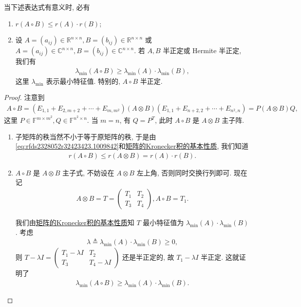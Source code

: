 \documentclass[../../main.tex]{subfiles}%
\begin{document}
\begin{theorem}[矩阵的Hadamard积的性质]
当下述表达式有意义时, 必有
\begin{enumerate}
\item $r(A\circ B)\leqslant r(A)\cdot r(B)$;

\item 设 $A=(a_{ij})\in\mathbb{R}^{n\times n}, B=(b_{ij})\in\mathbb{R}^{n\times n}$ 或 $A=(a_{ij})\in\mathbb{C}^{n\times n}, B=(b_{ij})\in\mathbb{C}^{n\times n}$. 若 $A,B$ 半正定或 Hermite 半正定, 我们有
\begin{align*}
\lambda_{\min}(A\circ B)\geqslant \lambda_{\min}(A)\cdot\lambda_{\min}(B),
\end{align*}
这里 $\lambda_{\min}$ 表示最小特征值. 特别的, $A\circ B$ 半正定.
\end{enumerate}
\end{theorem}
\begin{proof}

注意到
\begin{align}\label{eq:rfds2328052r32423423.1009842}
A\circ B=(E_{1,1}+E_{2,m+2}+\cdots+E_{m,m^2})(A\otimes B)(E_{1,1}+E_{n+2,2}+\cdots+E_{n^2,n})=P(A\otimes B)Q,
\end{align}
这里 $P\in\mathbb{F}^{m\times m^2}, Q\in\mathbb{F}^{n^2\times n}$. 当 $m=n$, 有 $Q=P^T$, 此时 $A\circ B$ 是 $A\otimes B$ 主子阵. 
\begin{enumerate}
\item 子矩阵的秩当然不小于等于原矩阵的秩, 于是由\eqref{eq:rfds2328052r32423423.1009842}和\hyperref[theorem:矩阵的Kronecker积的基本性质]{矩阵的Kronecker积的基本性质}, 我们知道
\begin{align*}
r(A\circ B)\leqslant r(A\otimes B)=r(A)\cdot r(B).
\end{align*}

\item $A\circ B$ 是 $A\otimes B$ 主子式, 不妨设在 $A\otimes B$ 左上角, 否则同时交换行列即可. 现在记
\begin{align*}
A\otimes B=T=\begin{pmatrix}T_1&T_2\\T_3&T_4\end{pmatrix}, A\circ B=T_1.
\end{align*}

我们由\hyperref[theorem:矩阵的Kronecker积的基本性质]{矩阵的Kronecker积的基本性质}知 $T$ 最小特征值为 $\lambda_{\min}(A)\cdot\lambda_{\min}(B)$. 考虑
\begin{align*}
\lambda\triangleq\lambda_{\min}(A)\cdot\lambda_{\min}(B)\geqslant 0,
\end{align*}
则 $T-\lambda I=\begin{pmatrix}T_1-\lambda I&T_2\\T_3&T_4-\lambda I\end{pmatrix}$ 还是半正定的, 故 $T_1-\lambda I$ 半正定. 这就证明了
\begin{align*}
\lambda_{\min}(A\circ B)\geqslant \lambda_{\min}(A)\cdot\lambda_{\min}(B).
\end{align*}
\end{enumerate}

\end{proof}
\end{document}
